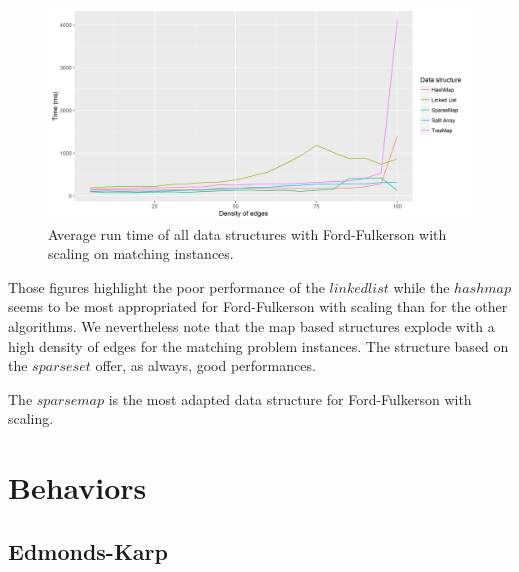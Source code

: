 \begin{figure}[H]
\begin{center}
\includegraphics[scale=0.5]{images/results/ffmeanmatching.png}
\caption{Average run time of all data structures with Ford-Fulkerson with scaling on matching instances.}
\label{fig:ffmeanmatching}
\end{center}
\end{figure}


Those figures highlight the poor performance of the $linked list$ while the $hash map$ seems to be most appropriated for Ford-Fulkerson with scaling than for the other algorithms. We nevertheless note that the map based structures explode with a high density of edges for the matching problem instances. The structure based on the $sparse set$ offer, as always, good performances. 

The $sparse map$ is the most adapted data structure for Ford-Fulkerson with scaling.
\section{Behaviors}
\subsection{Edmonds-Karp}

